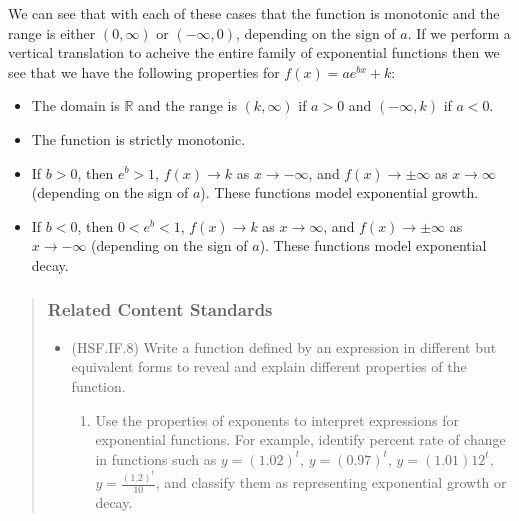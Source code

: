 \documentclass[
]{book}
\providecommand{\tightlist}{%
  \setlength{\itemsep}{0pt}\setlength{\parskip}{0pt}}
\theoremstyle{definition}
\theoremstyle{definition}
\theoremstyle{definition}
\theoremstyle{remark}
\begin{document}
We can see that with each of these cases that the function is monotonic and the range is either \((0,\infty)\) or \((-\infty,0)\), depending on the sign of \(a\). If we perform a vertical translation to acheive the entire family of exponential functions then we see that we have the following properties for \(f(x) = a e^{bx} +k\):

\begin{itemize}
\tightlist
\item
  The domain is \(\mathbb{R}\) and the range is \((k,\infty)\) if \(a>0\) and \((-\infty,k)\) if \(a<0\).
\item
  The function is strictly monotonic.
\item
  If \(b>0\), then \(e^b>1\), \(f(x)\rightarrow k\) as \(x\rightarrow -\infty\), and \(f(x) \rightarrow \pm \infty\) as \(x\rightarrow \infty\) (depending on the sign of \(a\)). These functions model exponential growth.
\item
  If \(b<0\), then \(0<e^b<1\), \(f(x)\rightarrow k\) as \(x \rightarrow \infty\), and \(f(x) \rightarrow \pm \infty\) as \(x\rightarrow -\infty\) (depending on the sign of \(a\)). These functions model exponential decay.
\end{itemize}

\begin{quote}
\hypertarget{related-content-standards-43}{%
\subsubsection*{Related Content Standards}\label{related-content-standards-43}}

\begin{itemize}
\tightlist
\item
  (HSF.IF.8) Write a function defined by an expression in different but equivalent forms to reveal and explain different properties of the function.

  \begin{enumerate}
  \def\labelenumi{\alph{enumi}.}
  \setcounter{enumi}{1}
  \tightlist
  \item
    Use the properties of exponents to interpret expressions for exponential functions. For example, identify percent rate of change in functions such as \(y=(1.02)^t\), \(y = (0.97)^t\), \(y = (1.01)12^t\), \(y = \frac{(1.2)^t}{10}\), and classify them as representing exponential growth or decay.
  \end{enumerate}
\end{itemize}
\end{quote}
\end{document}
